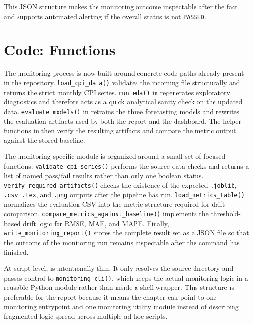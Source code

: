 This JSON structure makes the monitoring outcome inspectable after the fact and supports automated alerting if the overall status is not \texttt{PASSED}.

\section{Code: Functions}

The monitoring process is now built around concrete code paths already present in the repository. \texttt{load\_cpi\_data()} validates the incoming file structurally and returns the strict monthly CPI series. \texttt{run\_eda()} in  regenerates exploratory diagnostics and therefore acts as a quick analytical sanity check on the updated data. \texttt{evaluate\_models()} in  retrains the three forecasting models and rewrites the evaluation artifacts used by both the report and the dashboard. The helper functions in  then verify the resulting artifacts and compare the metric output against the stored baseline.

The monitoring-specific module is organized around a small set of focused functions. \texttt{validate\_cpi\_series()} performs the source-data checks and returns a list of named pass/fail results rather than only one boolean status. \texttt{verify\_required\_artifacts()} checks the existence of the expected \texttt{.joblib}, \texttt{.csv}, \texttt{.tex}, and \texttt{.png} outputs after the pipeline has run. \texttt{load\_metrics\_table()} normalizes the evaluation CSV into the metric structure required for drift comparison. \texttt{compare\_metrics\_against\_baseline()} implements the threshold-based drift logic for RMSE, MAE, and MAPE. Finally, \texttt{write\_monitoring\_report()} stores the complete result set as a JSON file so that the outcome of the monitoring run remains inspectable after the command has finished.

At script level,  is intentionally thin. It only resolves the source directory and passes control to \texttt{monitoring\_cli()}, which keeps the actual monitoring logic in a reusable Python module rather than inside a shell wrapper. This structure is preferable for the report because it means the chapter can point to one monitoring entrypoint and one monitoring utility module instead of describing fragmented logic spread across multiple ad hoc scripts.

